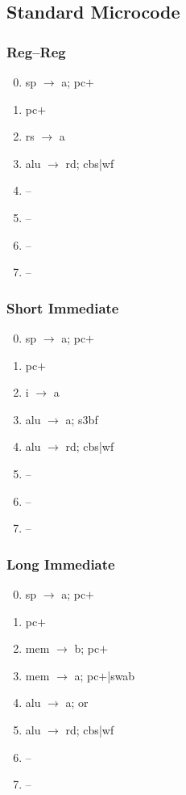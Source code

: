 \documentclass[11pt]{book}
\begin{document}
\subsection*{Standard Microcode}
\begin{multicols}{3}\ttfamily\selectfont\small
  \subsubsection*{Reg--Reg}
  \begin{enumerate}\setcounter{enumi}{-1}
  \item sp \(\rightarrow\) a; pc\(+\)
  \item pc\(+\)
  \item rs \(\rightarrow\) a
  \item alu \(\rightarrow\) rd; cbs|wf
  \item --
  \item --
  \item --
  \item --
  \end{enumerate}
  \columnbreak
  \subsubsection*{Short Immediate}
  \begin{enumerate}\setcounter{enumi}{-1}
  \item sp \(\rightarrow\) a; pc\(+\)
  \item pc\(+\)
  \item i \(\rightarrow\) a
  \item alu \(\rightarrow\) a; s3bf
  \item alu \(\rightarrow\) rd; cbs|wf
  \item --
  \item --
  \item --
  \end{enumerate}
  \columnbreak
  \subsubsection*{Long Immediate}
  \begin{enumerate}\setcounter{enumi}{-1}
  \item sp \(\rightarrow\) a; pc\(+\)
  \item pc\(+\)
  \item mem \(\rightarrow\) b; pc\(+\)
  \item mem \(\rightarrow\) a; pc\(+\)|swab
  \item alu \(\rightarrow\) a; or
  \item alu \(\rightarrow\) rd; cbs|wf
  \item --
  \item --
  \end{enumerate}
\end{multicols}
\end{document}
